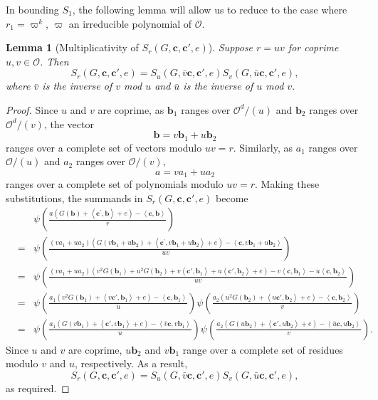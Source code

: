 \documentclass[10pt]{amsart}
\theoremstyle{plain}
\theoremstyle{plain}
\newtheorem{lemma}[theorem]{Lemma}
\renewcommand{\vec}[1]{\mathbf{#1}}
\theoremstyle{remark}
\theoremstyle{definition}
\begin{document}
In bounding $S_1$, the following lemma will allow us to reduce to the case where $r_1=\varpi^k$, $\varpi$ an irreducible polynomial of $\mathcal{O}$.
\begin{lemma}[Multiplicativity of $S_r(G,\vec{c},\vec{c}',e)$]\label{lem:multiplicative}Suppose $r=uv$ for coprime $u,v\in\mathcal{O}$. Then
\[S_r(G,\vec{c},\vec{c}',e)=S_u(G,\bar{v}\vec{c},\vec{c}',e)S_v(G,\bar{u}\vec{c},\vec{c}',e),\]
where $\bar{v}$ is the inverse of $v$ mod $u$ and $\bar{u}$ is the inverse of $u$ mod $v.$
\end{lemma}
\begin{proof}Since $u$ and $v$ are coprime, as $\vec{b}_1$ ranges over $\mathcal{O}^d/(u)$ and $\vec{b}_2$ ranges over $\mathcal{O}^d/(v)$, the vector
\[\vec{b}=v\vec{b}_1+u\vec{b}_2\]
ranges over a complete set of vectors modulo $uv=r$. Similarly, as $a_1$ ranges over $\mathcal{O}/(u)$ and $a_2$ ranges over $\mathcal{O}/(v)$,
\[a=va_1+ua_2\]
ranges over a complete set of polynomials modulo $uv=r$. Making these substitutions, the summands in $S_r(G,\vec{c},\vec{c}',e)$
become
\begin{eqnarray*}
&&\psi\left(\frac{a(G(\vec{b})+\left<\vec{c}^{\prime},\vec{b}\right>+e)-\left<\vec{c},\vec{b}\right>}{r}\right)\\&=&
\psi\left(\frac{(va_1+ua_2)(G(v\vec{b}_1+u\vec{b}_2)+\left<\vec{c}^{\prime},v\vec{b}_1+u\vec{b}_2\right>+e)-\left<\vec{c},v\vec{b}_1+u\vec{b}_2\right>}{uv}\right)\\&=& 
\psi\left(\frac{(va_1+ua_2)(v^2G(\vec{b}_1)+u^2G(\vec{b}_2)+v\left<\vec{c}',\vec{b}_1\right>+u\left<\vec{c}',\vec{b}_2\right>+e)-v\left<\vec{c},\vec{b}_1\right>-u\left<\vec{c},\vec{b}_2\right>}{uv}\right)\\&=& \psi\left(\frac{a_1(v^2G(\vec{b}_1)+\left<v\vec{c}',\vec{b}_1\right>+e)-\left<\vec{c},\vec{b}_1\right>}{u}\right)\psi\left(\frac{a_2(u^2G(\vec{b}_2)+\left<u\vec{c}',\vec{b}_2\right>+e)-\left<\vec{c},\vec{b}_2\right>}{v}\right)\\&=& \psi\left(\frac{a_1(G(v\vec{b}_1)+\left<\vec{c}',v\vec{b}_1\right>+e)-\left<\bar{v}\vec{c},v\vec{b}_1\right>}{u}\right)\psi\left(\frac{a_2(G(u\vec{b}_2)+\left<\vec{c}',u\vec{b}_2\right>+e)-\left<\bar{u}\vec{c},u\vec{b}_2\right>}{v}\right).
\end{eqnarray*}
Since $u$ and $v$ are coprime, $u\vec{b}_2$ and $v\vec{b}_1$ range over a complete set of residues modulo $v$ and $u$, respectively. As a result,
\[S_r(G,\vec{c},\vec{c}',e)=S_u(G,\bar{v}\vec{c},\vec{c}',e)S_v(G,\bar{u}\vec{c},\vec{c}',e),\]
as required.
\end{proof}
\end{document}

